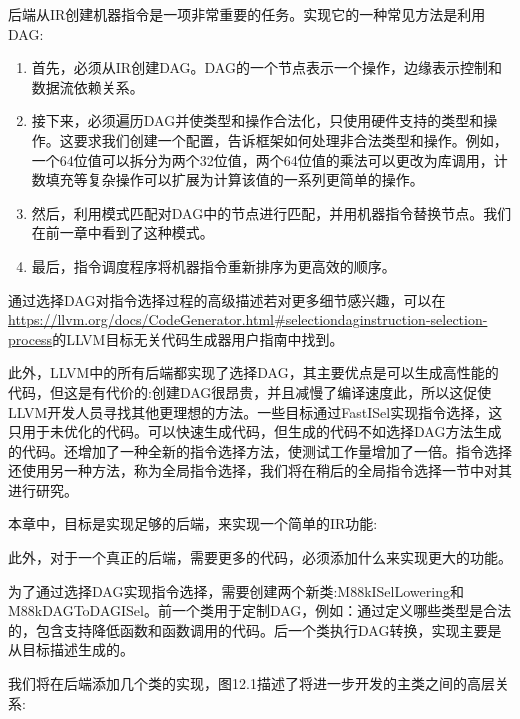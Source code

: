 

后端从IR创建机器指令是一项非常重要的任务。实现它的一种常见方法是利用DAG:

\begin{enumerate}
\item
首先，必须从IR创建DAG。DAG的一个节点表示一个操作，边缘表示控制和数据流依赖关系。

\item
接下来，必须遍历DAG并使类型和操作合法化，只使用硬件支持的类型和操作。这要求我们创建一个配置，告诉框架如何处理非合法类型和操作。例如，一个64位值可以拆分为两个32位值，两个64位值的乘法可以更改为库调用，计数填充等复杂操作可以扩展为计算该值的一系列更简单的操作。

\item
然后，利用模式匹配对DAG中的节点进行匹配，并用机器指令替换节点。我们在前一章中看到了这种模式。

\item
最后，指令调度程序将机器指令重新排序为更高效的顺序。
\end{enumerate}

通过选择DAG对指令选择过程的高级描述若对更多细节感兴趣，可以在\url{https://llvm.org/docs/CodeGenerator.html#selectiondaginstruction-selection-process}的LLVM目标无关代码生成器用户指南中找到。

此外，LLVM中的所有后端都实现了选择DAG，其主要优点是可以生成高性能的代码，但这是有代价的:创建DAG很昂贵，并且减慢了编译速度此，所以这促使LLVM开发人员寻找其他更理想的方法。一些目标通过FastISel实现指令选择，这只用于未优化的代码。可以快速生成代码，但生成的代码不如选择DAG方法生成的代码。还增加了一种全新的指令选择方法，使测试工作量增加了一倍。指令选择还使用另一种方法，称为全局指令选择，我们将在稍后的全局指令选择一节中对其进行研究。

本章中，目标是实现足够的后端，来实现一个简单的IR功能:


此外，对于一个真正的后端，需要更多的代码，必须添加什么来实现更大的功能。

为了通过选择DAG实现指令选择，需要创建两个新类:M88kISelLowering和M88kDAGToDAGISel。前一个类用于定制DAG，例如：通过定义哪些类型是合法的，包含支持降低函数和函数调用的代码。后一个类执行DAG转换，实现主要是从目标描述生成的。

我们将在后端添加几个类的实现，图12.1描述了将进一步开发的主类之间的高层关系:

